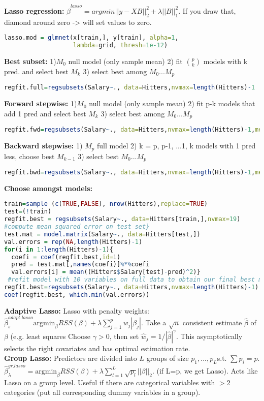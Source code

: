 \textbf{Lasso regression: }
$\hat\beta^{lasso} = argmin ||y-XB||_2^2+ \lambda||B||_1^2$. If you draw that, diamond around zero -> will set values to zero. 
\begin{lstlisting}[language=R]
lasso.mod = glmnet(x[train,], y[train], alpha=1, 
                   lambda=grid, thresh=1e-12)
\end{lstlisting}
\textbf{Best subset: }
1)$M_0$ null model (only sample mean)
2) fit $p \choose k$ models with k pred. and select best $M_k$
3) select best among $M_0 ... M_p$
\begin{lstlisting}[language=R]
regfit.full=regsubsets(Salary~., data=Hitters,nvmax=length(Hitters)-1
\end{lstlisting}

\textbf{Forward stepwise: }
1)$M_0$ null model (only sample mean)
2) fit p-k models that add 1 pred and select best $M_k$
3) select best among $M_0 ... M_p$
\begin{lstlisting}[language=R]
regfit.fwd=regsubsets(Salary~., data=Hitters,nvmax=length(Hitters)-1,method="forward")
\end{lstlisting}
\textbf{Backward stepwise: }
1) $M_p$ full model
2) k = p, p-1, ...1,
k models with 1 pred less, choose best $M_{k-1}$
3) select best $M_0 ... M_p$
\begin{lstlisting}[language=R]
regfit.bwd=regsubsets(Salary~., data=Hitters,nvmax=length(Hitters)-1,method="backward")
\end{lstlisting}
\textbf{Choose amongst models: }
\begin{lstlisting}[language=R]
train=sample (c(TRUE,FALSE), nrow(Hitters),replace=TRUE)
test=(!train)
regfit.best = regsubsets(Salary~., data=Hitters[train,],nvmax=19)
#compute mean squared error on test set}
test.mat = model.matrix(Salary~., data=Hitters[test,])
val.errors = rep(NA,length(Hitters)-1)
for(i in 1:length(Hitters)-1){
  coefi = coef(regfit.best,id=i)
  pred = test.mat[,names(coefi)]%*%coefi
  val.errors[i] = mean((Hitters$Salary[test]-pred)^2)}
 #refit model with 10 variables on full data to obtain our final best model
regfit.best=regsubsets(Salary~., data=Hitters,nvmax=length(Hitters)-1)
coef(regfit.best, which.min(val.errors))
\end{lstlisting}

\textbf{Adaptive Lasso:} Lasso with penalty weights: $\hat\beta_s^{adapt.lasso}\text{argmin}_\beta RSS(\beta) + \lambda \sum_{j=1}^p w_j |\beta_j|$. Take a $\sqrt{n}$ consistent estimate $\hat\beta$ of $\beta$ (e.g. least squares Choose $\gamma>0$, then set $\hat w_j = {1}/{|\hat\beta|^\gamma}$. This asymptotically selects the right covariates and has optimal estimation rate.\\
\textbf{Group Lasso:} Predictors are divided into $L$ groups of size $p_1, ..., p_L$s.t. $\sum p_i = p$. $\hat\beta_\lambda^{gr.lasso}=\text{argmin}_\beta RSS(\beta)+\lambda \sum_{l=1}^L \sqrt{p_l} ||\beta||_2$. (if L=p, we get Lasso). Acts like Lasso on a group level. Useful if there are categorical variables with $>2$ categories (put all corresponding dummy variables in a group).
